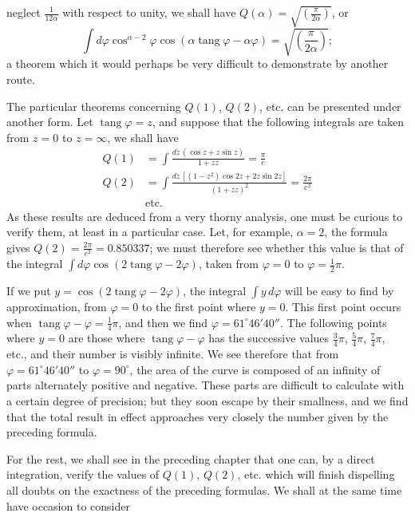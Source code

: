 \documentclass{article}
\begin{document}
neglect $\frac{1}{12\alpha}$ with respect to unity, we shall have $Q(\alpha)=\sqrt{\left(\frac{\pi}{2\alpha}\right)}$, or
\[ \int d\varphi\cos^{\alpha-2}\varphi\cos(\alpha\operatorname{tang}\varphi-\alpha\varphi)=\sqrt{\left(\frac{\pi}{2\alpha}\right)}; \]
a theorem which it would perhaps be very difficult to demonstrate by another route.

The particular theorems concerning $Q(1)$, $Q(2)$, etc. can be presented under another form. Let $\operatorname{tang}\varphi=z$, and suppose that the following integrals are taken from $z=0$ to $z=\infty$, we shall have
\[ \begin{aligned} Q(1)&=\int\frac{dz\,(\cos z+z\sin z)}{1+zz}=\frac{\pi}{e}\\ Q(2)&=\int\frac{dz\,[(1-z^{2})\cos 2z+2z\sin 2z]}{(1+zz)^{2}}=\frac{2\pi}{e^{2}}\\ &\text{etc.} \end{aligned} \tag{4} \]
As these results are deduced from a very thorny analysis, one must be curious to verify them, at least in a particular case. Let, for example, $\alpha=2$, the formula gives $Q(2)=\frac{2\pi}{e^{2}}=0.850337$; we must therefore see whether this value is that of the integral $\displaystyle\int d\varphi\cos(2\operatorname{tang}\varphi-2\varphi)$, taken from $\varphi=0$ to $\varphi=\frac{1}{2}\pi$.

If we put $y=\cos(2\operatorname{tang}\varphi-2\varphi)$, the integral $\displaystyle\int y\,d\varphi$ will be easy to find by approximation, from $\varphi=0$ to the first point where $y=0$. This first point occurs when $\operatorname{tang}\varphi-\varphi=\frac{1}{4}\pi$, and then we find $\varphi=61^{\circ}46'40''$. The following points where $y=0$ are those where $\operatorname{tang}\varphi-\varphi$ has the successive values $\frac{3}{4}\pi$, $\frac{5}{4}\pi$, $\frac{7}{4}\pi$, etc., and their number is visibly infinite. We see therefore that from $\varphi=61^{\circ}46'40''$ to $\varphi=90^{\circ}$, the area of the curve is composed of an infinity of parts alternately positive and negative. These parts are difficult to calculate with a certain degree of precision; but they soon escape by their smallness, and we find that the total result in effect approaches very closely the number given by the preceding formula.

For the rest, we shall see in the preceding chapter that one can, by a direct integration, verify the values of $Q(1)$, $Q(2)$, etc. which will finish dispelling all doubts on the exactness of the preceding formulas. We shall at the same time have occasion to consider
\end{document}
